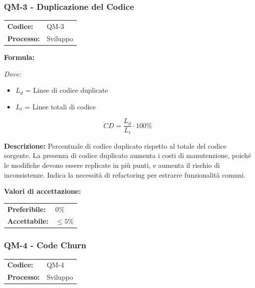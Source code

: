 \documentclass[a4paper,11pt,oneside]{scrartcl}
\begin{document}
\subsubsection{QM-3 - Duplicazione del Codice}

\noindent
\begin{tabular}{@{}p{}p{}@{}}
    \textbf{Codice:}   & QM-3     \\
    \textbf{Processo:} & Sviluppo \\
\end{tabular}

\vspace{0.3cm}
\noindent\textbf{Formula:}

\noindent\textit{Dove:}
\begin{itemize}[leftmargin=1.5cm, topsep=0pt, itemsep=0pt]
    \item $L_d$ = Linee di codice duplicate
    \item $L_t$ = Linee totali di codice
\end{itemize}

\[
    CD = \frac{L_d}{L_t} \cdot 100\%
\]

\noindent\textbf{Descrizione:} Percentuale di codice duplicato rispetto al totale del codice sorgente. La presenza di codice duplicato aumenta i costi di manutenzione, poiché le modifiche devono essere replicate in più punti, e aumenta il rischio di inconsistenze. Indica la necessità di refactoring per estrarre funzionalità comuni.

\vspace{0.2cm}
\noindent\textbf{Valori di accettazione:}
\vspace{0.1cm}

\noindent
\begin{tabular}{@{}ll@{}}
    \textbf{Preferibile:} & $0\%$     \\
    \textbf{Accettabile:} & $\le 5\%$ \\
\end{tabular}

\subsubsection{QM-4 - Code Churn}

\noindent
\begin{tabular}{@{}p{}p{}@{}}
    \textbf{Codice:}   & QM-4     \\
    \textbf{Processo:} & Sviluppo \\
\end{tabular}
\end{document}

